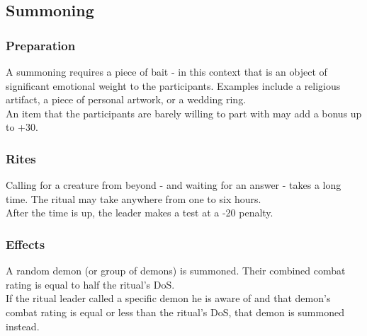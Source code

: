 %
\subsection*{Summoning}
\label{ritual:summoning}
\subsubsection*{Preparation}
A summoning requires a piece of bait -
in this context that is an object of significant emotional weight to the participants.
Examples include a religious artifact, a piece of personal artwork, or a wedding ring.
\\%
An item that the participants are barely willing to part with may add a bonus up to +30.
\subsubsection*{Rites}
Calling for a creature from beyond - and waiting for an answer - takes a long time.
The ritual may take anywhere from one to six hours.
\\%
After the time is up, the leader makes a test at a -20 penalty.
\subsubsection*{Effects}
A random demon (or group of demons) is summoned.
Their combined combat rating is equal to half the ritual's DoS.
\\%
If the ritual leader called a specific demon he is aware of
and that demon's combat rating is equal or less than the ritual's DoS,
that demon is summoned instead.

